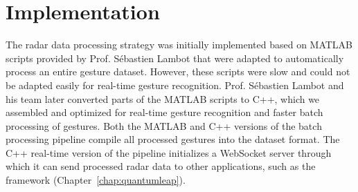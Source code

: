 \section{Implementation} \label{sec:radar-challenges:implementation}
The radar data processing strategy was initially implemented based on MATLAB scripts provided by Prof. S\'ebastien Lambot that were adapted to automatically process an entire gesture dataset. However, these scripts were slow and could not be adapted easily for real-time gesture recognition.
%
Prof. S\'ebastien Lambot and his team later converted parts of the MATLAB scripts to C++, which we assembled and optimized for real-time gesture recognition and faster batch processing of gestures.
Both the MATLAB and C++ versions of the batch processing pipeline compile all processed gestures into the \ql dataset format. 
The C++ real-time version of the pipeline initializes a WebSocket server through which it can send processed radar data to other applications, such as the \ql framework (Chapter~\ref{chap:quantumleap}).

